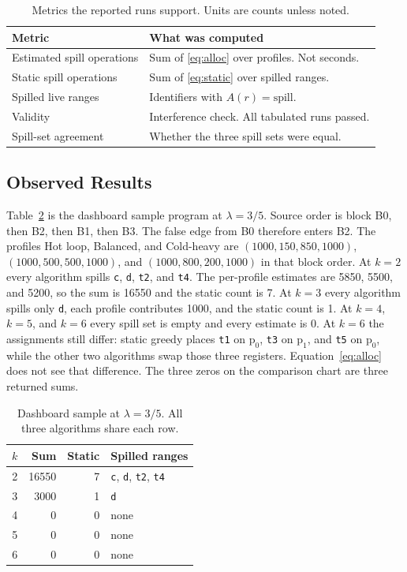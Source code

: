 \documentclass{ieeeaccess}
\begin{document}
\begin{table}[t]
\caption{Metrics the reported runs support. Units are counts unless noted.}
\label{tab:metrics}
\centering
\begin{tabular}{@{}>{\raggedright\arraybackslash}p{}>{\raggedright\arraybackslash}p{}@{}}
\toprule
Metric & What was computed \\
\midrule
Estimated spill operations & Sum of \eqref{eq:alloc} over profiles. Not seconds. \\
Static spill operations & Sum of \eqref{eq:static} over spilled ranges. \\
Spilled live ranges & Identifiers with $A(r)=\mathrm{spill}$. \\
Validity & Interference check. All tabulated runs passed. \\
Spill-set agreement & Whether the three spill sets were equal. \\
\bottomrule
\end{tabular}
\end{table}

\subsection{Observed Results}
\label{sec:observed}
Table~\ref{tab:dashboard} is the dashboard sample program at $\lambda = 3/5$.
Source order is block B0, then B2, then B1, then B3.
The false edge from B0 therefore enters B2.
The profiles Hot loop, Balanced, and Cold-heavy are $(1000,150,850,1000)$, $(1000,500,500,1000)$, and $(1000,800,200,1000)$ in that block order.
At $k = 2$ every algorithm spills \texttt{c}, \texttt{d}, \texttt{t2}, and \texttt{t4}.
The per-profile estimates are 5850, 5500, and 5200, so the sum is 16550 and the static count is 7.
At $k = 3$ every algorithm spills only \texttt{d}, each profile contributes 1000, and the static count is 1.
At $k = 4$, $k = 5$, and $k = 6$ every spill set is empty and every estimate is 0.
At $k = 6$ the assignments still differ: static greedy places \texttt{t1} on $\mathrm{p}_0$, \texttt{t3} on $\mathrm{p}_1$, and \texttt{t5} on $\mathrm{p}_0$, while the other two algorithms swap those three registers.
Equation~\eqref{eq:alloc} does not see that difference.
The three zeros on the comparison chart are three returned sums.

\begin{table}[t]
\caption{Dashboard sample at $\lambda = 3/5$. All three algorithms share each row.}
\label{tab:dashboard}
\centering
\begin{tabular}{@{}rrrl@{}}
\toprule
$k$ & Sum & Static & Spilled ranges \\
\midrule
2 & 16550 & 7 & \texttt{c}, \texttt{d}, \texttt{t2}, \texttt{t4} \\
3 & 3000 & 1 & \texttt{d} \\
4 & 0 & 0 & none \\
5 & 0 & 0 & none \\
6 & 0 & 0 & none \\
\bottomrule
\end{tabular}
\end{table}
\end{document}
